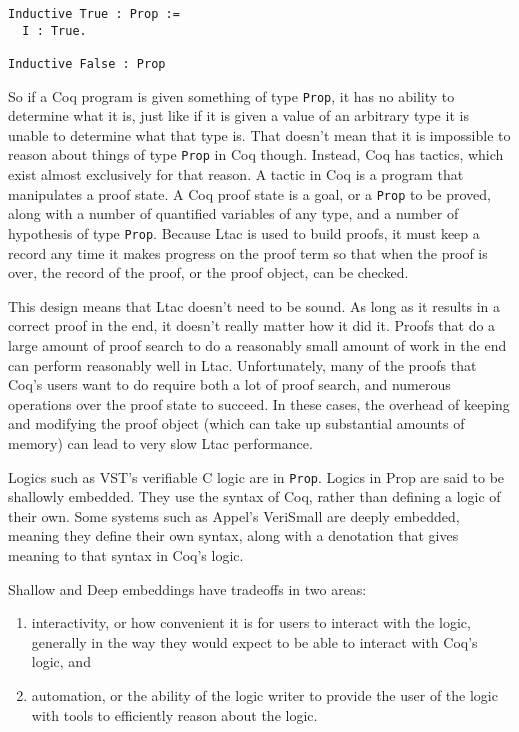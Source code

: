 \documentclass{puthesis}
\begin{document}
\begin{lstlisting}
Inductive True : Prop :=
  I : True.

Inductive False : Prop
\end{lstlisting}

So if a Coq program is given something of type \lstinline|Prop|, it
has no ability to determine what it is, just like if it is given a
value of an arbitrary type it is unable to determine what that type
is. That doesn't mean that it is impossible to reason about things of
type \lstinline|Prop| in Coq though. Instead, Coq has tactics, which
exist almost exclusively for that reason. A tactic in Coq is a program
that manipulates a proof state. A Coq proof state is a goal, or a
\lstinline|Prop| to be proved, along with a number of quantified
variables of any type, and a number of hypothesis of type
\lstinline|Prop|. Because Ltac is used to build proofs, it must keep a
record any time it makes progress on the proof term so that when the
proof is over, the record of the proof, or the proof object, can be
checked.

This design means that Ltac doesn't need to be sound. As long as it
results in a correct proof in the end, it doesn't really matter how it
did it. Proofs that do a large amount of proof search to do a
reasonably small amount of work in the end can perform reasonably well
in Ltac. Unfortunately, many of the proofs that Coq's users want to do
require both a lot of proof search, and numerous operations over the
proof state to succeed. In these cases, the overhead of keeping and
modifying the
proof object (which can take up substantial amounts of memory) can
lead to very slow Ltac performance. 

Logics such as VST's verifiable C logic are in
\lstinline|Prop|. Logics in Prop are said to be shallowly
embedded. They use the syntax of Coq, rather than defining a logic of
their own. Some systems such as Appel's VeriSmall \cite{} are deeply
embedded, meaning they define their own syntax, along with a
denotation that gives meaning to that syntax in Coq's logic. 

Shallow and Deep embeddings have tradeoffs in two areas:

\begin{enumerate}
\item interactivity, or how convenient it is for users to interact
  with the logic, generally in the way they would expect to be able to
  interact with Coq's logic, and
\item automation, or the ability of the logic writer to provide the
  user of the logic with tools to efficiently reason about the logic.
\end{enumerate}
\end{document}
